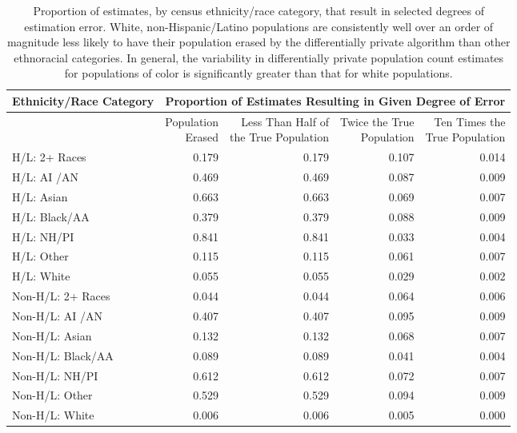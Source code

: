 \begin{table}[ht]
\centering
\begin{tabular}{l|rrrr} 
 Ethnicity/Race Category & \multicolumn{4}{c}{Proportion of Estimates Resulting in Given Degree of Error} \\
 \hline
 & \thead{Population \\ Erased} & \thead{Less Than Half of \\ the True Population} & \thead{Twice the True \\ Population} & \thead{Ten Times the \\ True Population} \\ 
  \hline
H/L: 2+ Races & 0.179 & 0.179 & 0.107 & 0.014 \\ 
H/L: AI /AN & 0.469 & 0.469 & 0.087 & 0.009 \\ 
  H/L: Asian & 0.663 & 0.663 & 0.069 & 0.007 \\ 
  H/L: Black/AA & 0.379 & 0.379 & 0.088 & 0.009 \\ 
  H/L: NH/PI & 0.841 & 0.841 & 0.033 & 0.004 \\ 
  H/L: Other & 0.115 & 0.115 & 0.061 & 0.007 \\ 
  H/L: White & 0.055 & 0.055 & 0.029 & 0.002 \\ 
   \hline
Non-H/L: 2+ Races & 0.044 & 0.044 & 0.064 & 0.006 \\ 
  Non-H/L: AI /AN & 0.407 & 0.407 & 0.095 & 0.009 \\ 
  Non-H/L: Asian & 0.132 & 0.132 & 0.068 & 0.007 \\ 
  Non-H/L: Black/AA & 0.089 & 0.089 & 0.041 & 0.004 \\ 
  Non-H/L: NH/PI & 0.612 & 0.612 & 0.072 & 0.007 \\ 
  Non-H/L: Other & 0.529 & 0.529 & 0.094 & 0.009 \\ 
  Non-H/L: White & 0.006 & 0.006 & 0.005 & 0.000 \\ 
  \end{tabular}
  \caption{Proportion of estimates, by census ethnicity/race category, that result in selected degrees of estimation error. White, non-Hispanic/Latino populations are consistently well over an order of magnitude less likely to have their population erased by the differentially private algorithm than other ethnoracial categories. In general, the variability in differentially private population count estimates for populations of color is significantly greater than that for white populations.}
  \label{tab:error-by}
\end{table}